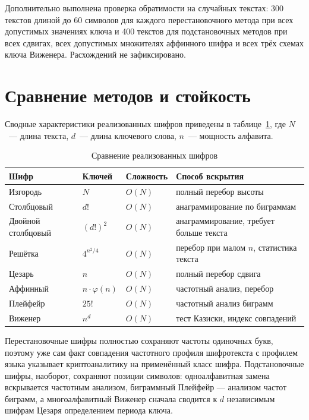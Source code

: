 \documentclass[14pt,a4paper]{extarticle}
\begin{document}
Дополнительно выполнена проверка обратимости на случайных текстах: 300 текстов длиной
до 60 символов для каждого перестановочного метода при всех допустимых значениях ключа
и 400 текстов для подстановочных методов при всех сдвигах, всех допустимых множителях
аффинного шифра и всех трёх схемах ключа Виженера. Расхождений не зафиксировано.


\section{Сравнение методов и стойкость}

Сводные характеристики реализованных шифров приведены в таблице~\ref{tab:compare},
где $N$~--- длина текста, $d$~--- длина ключевого слова, $n$~--- мощность алфавита.

\begin{table}[H]
\caption{Сравнение реализованных шифров}
\label{tab:compare}
\centering
\begin{tabularx}{\textwidth}{lllX}
\toprule
Шифр & Ключей & Сложность & Способ вскрытия \\
\midrule
Изгородь & $N$ & $O(N)$ & полный перебор высоты \\
Столбцовый & $d!$ & $O(N)$ & анаграммирование по биграммам \\
Двойной столбцовый & $(d!)^2$ & $O(N)$ & анаграммирование, требует больше текста \\
Решётка & $4^{n^2/4}$ & $O(N)$ & перебор при малом $n$, статистика текста \\
Цезарь & $n$ & $O(N)$ & полный перебор сдвига \\
Аффинный & $n \cdot \varphi(n)$ & $O(N)$ & частотный анализ, перебор \\
Плейфейр & $25!$ & $O(N)$ & частотный анализ биграмм \\
Виженер & $n^d$ & $O(N)$ & тест Казиски, индекс совпадений \\
\bottomrule
\end{tabularx}
\end{table}

Перестановочные шифры полностью сохраняют частоты одиночных букв, поэтому уже сам факт
совпадения частотного профиля шифротекста с профилем языка указывает криптоаналитику
на применённый класс шифра. Подстановочные шифры, наоборот, сохраняют позиции символов:
одноалфавитная замена вскрывается частотным анализом, биграммный Плейфейр --- анализом
частот биграмм, а многоалфавитный Виженер сначала сводится к $d$ независимым шифрам
Цезаря определением периода ключа.
\end{document}
